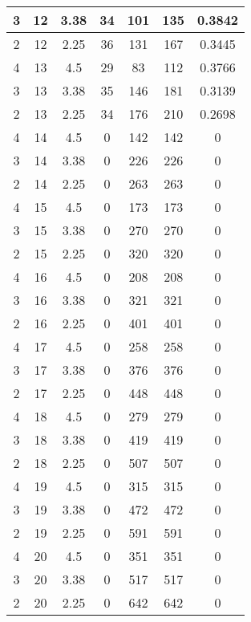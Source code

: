 \documentclass[letterpaper, 12pt]{article}
\begin{document}
\begin{longtable}{|c|c|c|c|c|c|c|}
\hline
3 & 12 & 3.38 & 34 & 101 & 135 & 0.3842 \\
\hline
2 & 12 & 2.25 & 36 & 131 & 167 & 0.3445 \\
\hline
4 & 13 & 4.5 & 29 & 83 & 112 & 0.3766 \\
\hline
3 & 13 & 3.38 & 35 & 146 & 181 & 0.3139 \\
\hline
2 & 13 & 2.25 & 34 & 176 & 210 & 0.2698 \\
\hline
4 & 14 & 4.5 & 0 & 142 & 142 & 0 \\
\hline
3 & 14 & 3.38 & 0 & 226 & 226 & 0 \\
\hline
2 & 14 & 2.25 & 0 & 263 & 263 & 0 \\
\hline
4 & 15 & 4.5 & 0 & 173 & 173 & 0 \\
\hline
3 & 15 & 3.38 & 0 & 270 & 270 & 0 \\
\hline
2 & 15 & 2.25 & 0 & 320 & 320 & 0 \\
\hline
4 & 16 & 4.5 & 0 & 208 & 208 & 0 \\
\hline
3 & 16 & 3.38 & 0 & 321 & 321 & 0 \\
\hline
2 & 16 & 2.25 & 0 & 401 & 401 & 0 \\
\hline
4 & 17 & 4.5 & 0 & 258 & 258 & 0 \\
\hline
3 & 17 & 3.38 & 0 & 376 & 376 & 0 \\
\hline
2 & 17 & 2.25 & 0 & 448 & 448 & 0 \\
\hline
4 & 18 & 4.5 & 0 & 279 & 279 & 0 \\
\hline
3 & 18 & 3.38 & 0 & 419 & 419 & 0 \\
\hline
2 & 18 & 2.25 & 0 & 507 & 507 & 0 \\
\hline
4 & 19 & 4.5 & 0 & 315 & 315 & 0 \\
\hline
3 & 19 & 3.38 & 0 & 472 & 472 & 0 \\
\hline
2 & 19 & 2.25 & 0 & 591 & 591 & 0 \\
\hline
4 & 20 & 4.5 & 0 & 351 & 351 & 0 \\
\hline
3 & 20 & 3.38 & 0 & 517 & 517 & 0 \\
\hline
2 & 20 & 2.25 & 0 & 642 & 642 & 0 \\
\hline
\end{longtable}
\end{document}
